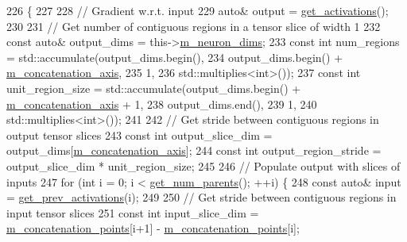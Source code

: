 \begin{DoxyCode}
226                         \{
227 
228     \textcolor{comment}{// Gradient w.r.t. input}
229     \textcolor{keyword}{auto}& output = \hyperlink{classlbann_1_1Layer_a1134b1a4385af199d7272c5aa827fa99}{get\_activations}();
230 
231     \textcolor{comment}{// Get number of contiguous regions in a tensor slice of width 1}
232     \textcolor{keyword}{const} \textcolor{keyword}{auto}& output\_dims = this->\hyperlink{classlbann_1_1Layer_abb34bb8031f57a483e2e327a5f229f48}{m\_neuron\_dims};
233     \textcolor{keyword}{const} \textcolor{keywordtype}{int} num\_regions = std::accumulate(output\_dims.begin(),
234                                             output\_dims.begin() + 
      \hyperlink{classlbann_1_1concatenation__layer_a4ac4a931dc85d622e9ea8fddb9625d38}{m\_concatenation\_axis},
235                                             1,
236                                             std::multiplies<int>());
237     \textcolor{keyword}{const} \textcolor{keywordtype}{int} unit\_region\_size = std::accumulate(output\_dims.begin() + 
      \hyperlink{classlbann_1_1concatenation__layer_a4ac4a931dc85d622e9ea8fddb9625d38}{m\_concatenation\_axis} + 1,
238                                                  output\_dims.end(),
239                                                  1,
240                                                  std::multiplies<int>());
241 
242     \textcolor{comment}{// Get stride between contiguous regions in output tensor slices}
243     \textcolor{keyword}{const} \textcolor{keywordtype}{int} output\_slice\_dim = output\_dims[\hyperlink{classlbann_1_1concatenation__layer_a4ac4a931dc85d622e9ea8fddb9625d38}{m\_concatenation\_axis}];
244     \textcolor{keyword}{const} \textcolor{keywordtype}{int} output\_region\_stride = output\_slice\_dim * unit\_region\_size;
245     
246     \textcolor{comment}{// Populate output with slices of inputs}
247     \textcolor{keywordflow}{for} (\textcolor{keywordtype}{int} i = 0; i < \hyperlink{classlbann_1_1Layer_ac9290d4a6453ccda5f6b4d8b57b49ba3}{get\_num\_parents}(); ++i) \{
248       \textcolor{keyword}{const} \textcolor{keyword}{auto}& input = \hyperlink{classlbann_1_1Layer_a45853df73a2e72bfaa774665a0f37ed7}{get\_prev\_activations}(i);
249 
250       \textcolor{comment}{// Get stride between contiguous regions in input tensor slices}
251       \textcolor{keyword}{const} \textcolor{keywordtype}{int} input\_slice\_dim = \hyperlink{classlbann_1_1concatenation__layer_a363324fe6cd104740334f3396085328c}{m\_concatenation\_points}[i+1] - 
      \hyperlink{classlbann_1_1concatenation__layer_a363324fe6cd104740334f3396085328c}{m\_concatenation\_points}[i];

\end{DoxyCode}
